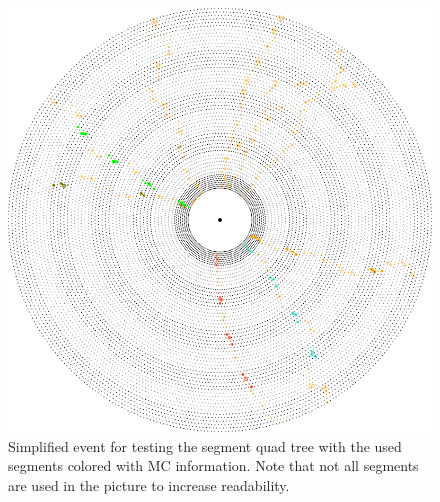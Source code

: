 \begin{figure}
  \centering
  \includegraphics[width=0.7\linewidth]{figures/workflow/quad_tree_segments_event.png}
  \caption{Simplified event for testing the segment quad tree with the used segments colored with MC information. Note that not all segments are used in the picture to increase readability.}
  \label{fig-quad-tree-event}
\end{figure}

